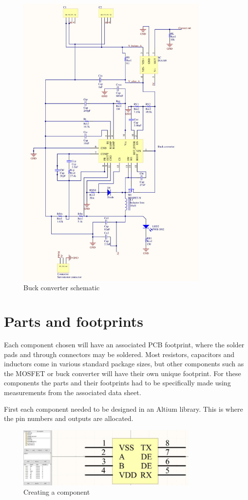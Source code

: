 \newpage
\begin{figure}[H]
\centering
\includegraphics[width=0.85\textwidth]{bucksch.jpg}
\caption{Buck converter schematic}
\end{figure} 

\newpage
\section{Parts and footprints}
Each component chosen will have an associated PCB footprint, where the solder pads and through connectors may be soldered. Most resistors, capacitors and inductors come in various standard package sizes, but other components such as the MOSFET or buck converter will have their own unique footprint. For these components the parts and their footprints had to be specifically made using measurements from the associated data sheet. 

First each component needed to be designed in an Altium library. This is where the pin numbers and outputs are allocated. 
\hspace{5mm}
\begin{figure}[H]
\centering
\includegraphics[width=0.8\textwidth]{library.JPG}
\caption{Creating a component}
\label{fig:model}
\end{figure} 

